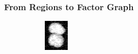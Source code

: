 \begin{frame}
    \frametitle{From Regions to Factor Graph}
    \begin{figure}
        \centering
        \begin{subfigure}[t]{0.23\textwidth}
            \centering
            \includegraphics[width=\textwidth]{images/joint/overseg/75/02/raw_contrast.png}
        \end{subfigure}
        ~
        \begin{subfigure}[t]{0.23\textwidth}
            \centering
\end{subfigure}
\end{figure}
\end{frame}
